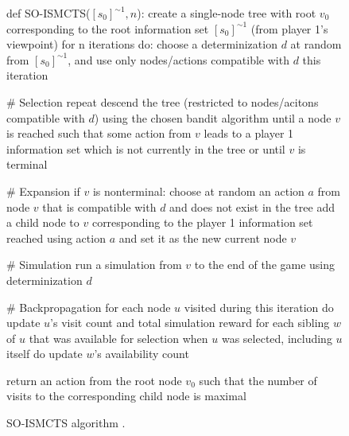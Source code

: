 \begin{figure}[ht]
\begin{code}[commandchars=\\\{\},codes={\catcode`\$=3\catcode`\^=7\catcode`\_=8}]
def SO-ISMCTS($[s_{0}]^{\sim1}, n$):
    create a single-node tree with root $v_{0}$ corresponding to the
        root information set $[s_{0}]^{\sim1}$ (from player 1's viewpoint)
    for n iterations do:
        choose a determinization $d$ at random from $[s_{0}]^{\sim1}$, and
        use only nodes/actions compatible with $d$ this iteration
        
        # Selection
        repeat
            descend the tree (restricted to nodes/acitons compatible 
            with $d$) using the chosen bandit algorithm
        until a node $v$ is reached such that some action from $v$ leads
        to a player 1 information set which is not
        currently in the tree or until $v$ is terminal
        
        # Expansion
        if $v$ is nonterminal:
            choose at random an action $a$ from node $v$ that is
            compatible with $d$ and does not exist in the tree
            add a child node to $v$ corresponding to the player
            1 information set reached using action $a$ and set
            it as the new current node $v$

        # Simulation
        run a simulation from $v$ to the end of the game using
        determinization $d$

        # Backpropagation
        for each node $u$ visited during this iteration do
            update $u$'s visit count and total simulation reward
            for each sibling $w$ of $u$ that was available for
            selection when $u$ was selected, including $u$ itself do
                update $w$'s availability count

    return an action from the root node $v_{0}$ such that the
    number of visits to the corresponding child node is maximal
\end{code}
\caption{SO-ISMCTS algorithm \cite{Cowling12}.}\label{figrw:soismcts}
\end{figure}

